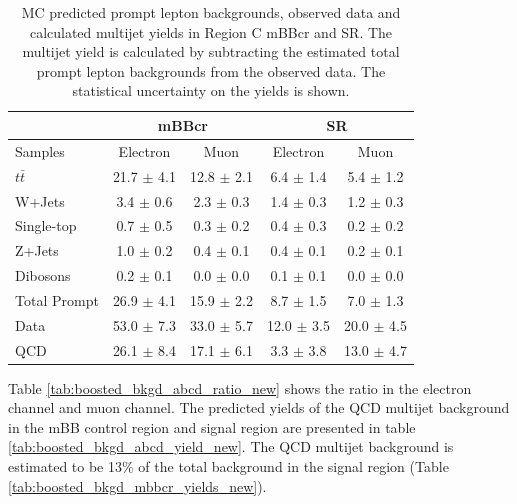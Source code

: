 \begin{table}
\begin{center}
\begin{tabular}{l|c|c||c|c}
             &\multicolumn{2}{c||}{mBBcr}               &\multicolumn{2}{c}{SR}\\
\hline
Samples       & Electron            & Muon               & Electron         & Muon     \\      
\hline
$t\bar{t}$          &   21.7	$\pm$ 4.1   &   12.8 $\pm$ 2.1	&  	6.4 $\pm$ 1.4		& 	5.4 $\pm$ 1.2\\
W+Jets          &   3.4 	$\pm$ 0.6   &    2.3 $\pm$ 0.3	&	1.4 $\pm$ 0.3		&  	1.2 $\pm$ 0.3\\
Single-top      &   0.7 	$\pm$ 0.5   &    0.3 $\pm$ 0.2	&	0.4 $\pm$ 0.3       	&  	0.2 $\pm$ 0.2\\
Z+Jets          &   1.0 	$\pm$ 0.2   &    0.4 $\pm$ 0.1	& 	0.4 $\pm$ 0.1        & 	0.2 $\pm$ 0.1\\
Dibosons   &   0.2 	$\pm$ 0.1   &    0.0 $\pm$ 0.0	&	0.1 $\pm$ 0.1       	& 	0.0 $\pm$ 0.0\\
\hline
Total Prompt         &   26.9 	$\pm$ 4.1   &   15.9 $\pm$ 2.2	&	8.7 $\pm$ 1.5       	& 	7.0 $\pm$ 1.3\\
\hline
Data           &   53.0 $\pm$ 7.3   &   33.0 $\pm$ 5.7	&	12.0 $\pm$ 3.5      	& 	20.0 $\pm$ 4.5\\
\hline
QCD            &   26.1 $\pm$ 8.4   &   17.1 $\pm$ 6.1	&	3.3 $\pm$ 3.8       	& 	13.0 $\pm$ 4.7\\
\end{tabular}
\end{center}
\caption[MC predicted prompt lepton backgrounds, observed data and calculated multijet yields
in Region C mBBcr and SR]{MC predicted prompt lepton backgrounds, observed data and calculated multijet yields
in Region C mBBcr and SR. The multijet yield is calculated by subtracting the estimated total prompt lepton
backgrounds from the observed data. The statistical uncertainty on the yields is shown.}
\label{tab:boosted_region_c_promptbkgd_data_new}
\end{table}
\indent Table \ref{tab:boosted_bkgd_abcd_ratio_new} shows the ratio in the electron channel and muon channel.
The predicted yields of the QCD multijet background in the mBB control region and signal region are presented in table \ref{tab:boosted_bkgd_abcd_yield_new}. The QCD multijet background is estimated to be 13\% of the total background in the signal region (Table \ref{tab:boosted_bkgd_mbbcr_yields_new}).

